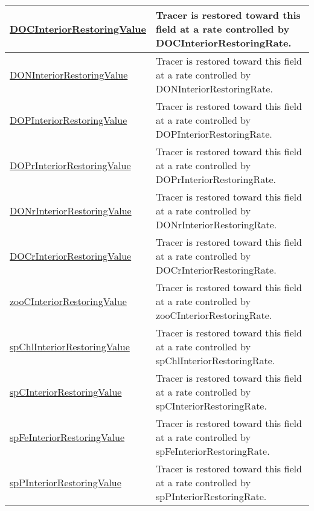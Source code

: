 {\begin{center}
\begin{longtable}{| p{2.0in} | p{4.0in} |}
    \hline
    \hyperref[subsec:var_sec_forcing_DOCInteriorRestoringValue]{DOCInteriorRestoringValue} & Tracer is restored toward this field at a rate controlled by DOCInteriorRestoringRate. \\
    \hline
    \hyperref[subsec:var_sec_forcing_DONInteriorRestoringValue]{DONInteriorRestoringValue} & Tracer is restored toward this field at a rate controlled by DONInteriorRestoringRate. \\
    \hline
    \hyperref[subsec:var_sec_forcing_DOPInteriorRestoringValue]{DOPInteriorRestoringValue} & Tracer is restored toward this field at a rate controlled by DOPInteriorRestoringRate. \\
    \hline
    \hyperref[subsec:var_sec_forcing_DOPrInteriorRestoringValue]{DOPrInteriorRestoringValue} & Tracer is restored toward this field at a rate controlled by DOPrInteriorRestoringRate. \\
    \hline
    \hyperref[subsec:var_sec_forcing_DONrInteriorRestoringValue]{DONrInteriorRestoringValue} & Tracer is restored toward this field at a rate controlled by DONrInteriorRestoringRate. \\
    \hline
    \hyperref[subsec:var_sec_forcing_DOCrInteriorRestoringValue]{DOCrInteriorRestoringValue} & Tracer is restored toward this field at a rate controlled by DOCrInteriorRestoringRate. \\
    \hline
    \hyperref[subsec:var_sec_forcing_zooCInteriorRestoringValue]{zooCInteriorRestoringValue} & Tracer is restored toward this field at a rate controlled by zooCInteriorRestoringRate. \\
    \hline
    \hyperref[subsec:var_sec_forcing_spChlInteriorRestoringValue]{spChlInteriorRestoringValue} & Tracer is restored toward this field at a rate controlled by spChlInteriorRestoringRate. \\
    \hline
    \hyperref[subsec:var_sec_forcing_spCInteriorRestoringValue]{spCInteriorRestoringValue} & Tracer is restored toward this field at a rate controlled by spCInteriorRestoringRate. \\
    \hline
    \hyperref[subsec:var_sec_forcing_spFeInteriorRestoringValue]{spFeInteriorRestoringValue} & Tracer is restored toward this field at a rate controlled by spFeInteriorRestoringRate. \\
    \hline
    \hyperref[subsec:var_sec_forcing_spPInteriorRestoringValue]{spPInteriorRestoringValue} & Tracer is restored toward this field at a rate controlled by spPInteriorRestoringRate. \\
    \hline

\end{longtable}
\end{center}}
